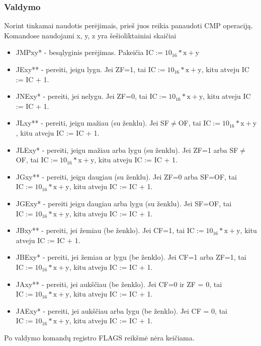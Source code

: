 \documentclass{VUMIFInfKursinis}
\begin{document}
\subsubsection{Valdymo}
Norint tinkamai naudotis perėjimais, prieš juos reikia panaudoti CMP operaciją. Komandose naudojami x, y, z yra šešioliktainiai skaičiai
\begin{itemize}
	\item JMPxy* - besąlyginis perėjimas. Pakeičia $ \text{IC} := 10_{16} * \text{x} + \text{y}$
	
	\item JExy** - pereiti, jeigu lygu. Jei ZF=1, tai $ \text{IC} := 10_{16} * \text{x} + \text{y}$, kitu atveju IC := IC + 1.
	\item JNExy* - pereiti, jei nelygu. Jei ZF=0, tai $ \text{IC} := 10_{16} * \text{x} + \text{y}$, kitu atveju IC := IC + 1.
	
	\item JLxy** - pereiti, jeigu mažiau (su ženklu). Jei SF$\neq$OF, tai $ \text{IC} := 10_{16} * \text{x} + \text{y}$, kitu atveju IC := IC + 1.
	\item JLExy* - pereiti, jeigu mažiau arba lygu (su ženklu). Jei ZF=1 arba SF$\neq$OF, tai $ \text{IC} := 10_{16} * \text{x} + \text{y}$, kitu atveju IC := IC + 1.
	\item JGxy** - pereiti, jeigu daugiau (su ženklu). Jei ZF=0 arba SF=OF, tai $ \text{IC} := 10_{16} * \text{x} + \text{y}$, kitu atveju IC := IC + 1.
	\item JGExy* - pereiti jeigu daugiau arba lygu (su ženklu). Jei SF=OF, tai $ \text{IC} := 10_{16} * \text{x} + \text{y}$, kitu atveju IC := IC + 1.
	
	\item JBxy** - pereiti, jei žemiau (be ženklo). Jei CF=1, tai $ \text{IC} := 10_{16} * \text{x} + \text{y}$, kitu atveju IC := IC + 1.
	\item JBExy* - pereiti, jei žemiau ar lygu (be ženklo). Jei CF=1 arba ZF=1, tai $ \text{IC} := 10_{16} * \text{x} + \text{y}$, kitu atveju IC := IC + 1.
	\item JAxy** - pereiti, jei aukščiau (be ženklo). Jei CF=0 ir ZF = 0, tai $ \text{IC} := 10_{16} * \text{x} + \text{y}$, kitu atveju IC := IC + 1.
	\item JAExy* - pereiti, jei aukščiau arba lygu (be ženklo). Jei CF = 0, tai $ \text{IC} := 10_{16} * \text{x} + \text{y}$, kitu atveju IC := IC + 1.
\end{itemize}

Po valdymo komandų registro FLAGS reikšmė nėra keičiama.
\end{document}
